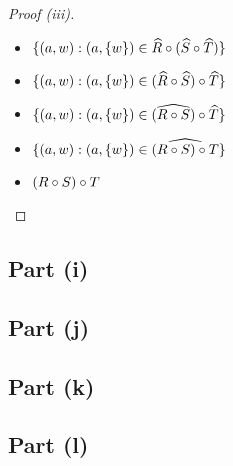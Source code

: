 \begin{prop}
\begin{proof}[Proof (iii)]
\begin{itemize}
      \item[\eqs]
        $\{(a,w):(a,\{w\})\in\widehat{R}\circ(\widehat{S}\circ\widehat{T})\}$
        \marginnote{\Thm-\ref{prop:rel-hat-comp}}

      \item[\eqs]
        $\{(a,w):(a,\{w\})\in(\widehat{R}\circ\widehat{S})\circ\widehat{T}\}$

      \item[\eqs]
        $\{(a,w):(a,\{w\})\in(\widehat{R\circ S})\circ\widehat{T}\}$
        \marginnote{\Thm-\ref{prop:rel-hat-comp}}

      \item[\eqs]
        $\{(a,w):(a,\{w\})\in\widehat{(R\circ S)\circ T}\}$
        \marginnote{\Thm-\ref{prop:rel-hat-comp}}

      \item[\eqs]
        $(R\circ S)\circ T$
        \qedhere
        \marginnote{\Thm-\ref{prop:rel-rel-hat}}
    \end{itemize}
  \end{proof}
\end{prop}

\subsection{Part (i)}\label{sec:q-2-i}
\subsection{Part (j)}\label{sec:q-2-j}
\subsection{Part (k)}\label{sec:q-2-k}
\subsection{Part (l)}\label{sec:q-2-l}
